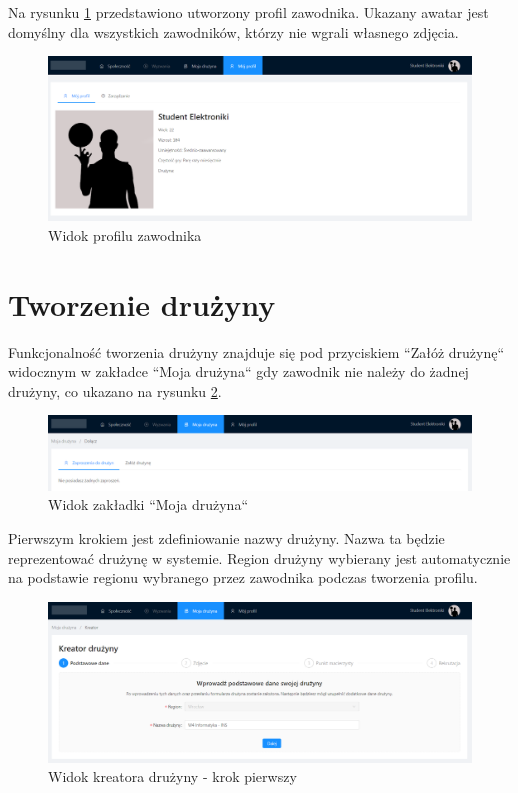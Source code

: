 Na rysunku \ref{fig:ss-profile-ready} przedstawiono utworzony profil zawodnika. Ukazany awatar jest domyślny dla wszystkich zawodników, którzy nie wgrali własnego zdjęcia.

\begin{figure}[H]
\centering
\includegraphics[width=\linewidth]{065-dzialanie/rys/ss-profile-ready.PNG}
\caption{Widok profilu zawodnika}
\label{fig:ss-profile-ready}
\end{figure}

\section{Tworzenie drużyny}
Funkcjonalność tworzenia drużyny znajduje się pod przyciskiem ``Załóż drużynę`` widocznym w zakładce ``Moja drużyna`` gdy zawodnik nie należy do żadnej drużyny, co ukazano na rysunku \ref{fig:ss-team-no}.

\begin{figure}[H]
\centering
\includegraphics[width=\linewidth]{065-dzialanie/rys/ss-team-no.PNG}
\caption{Widok zakładki ``Moja drużyna``}
\label{fig:ss-team-no}
\end{figure}

Pierwszym krokiem jest zdefiniowanie nazwy drużyny. Nazwa ta będzie reprezentować drużynę w systemie. Region drużyny wybierany jest automatycznie na podstawie regionu wybranego przez zawodnika podczas tworzenia profilu.


\begin{figure}[H]
\centering
\includegraphics[width=\linewidth]{065-dzialanie/rys/ss-team-1.PNG}
\caption{Widok kreatora drużyny - krok pierwszy}
\label{fig:ss-team-1}
\end{figure}

